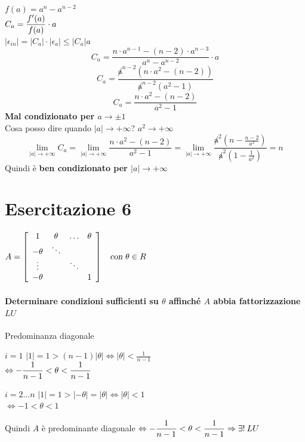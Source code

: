 \documentclass[10pt]{book}
\begin{document}
\paragraph{} $f(a) = a^n - a^{n-2}$\\
$C_a = \mathlarger{\frac{f'(a)}{f(a)}\cdot a}$\\
$|\epsilon_{in}| = |C_a|\cdot|\epsilon_a| \leq |C_a|a$
$$C_a = \frac{n\cdot a^{n-1} - (n-2)\cdot a^{n-3}}{a^n - a^{n-2}}\cdot a$$
$$C_a = \frac{\not a^{n-2}(n\cdot a^2 - (n-2))}{\not a^{n-2}(a^2 - 1)}$$
$$C_a = \frac{n\cdot a^2 - (n-2)}{a^2 - 1}$$
\textbf{Mal condizionato per $a\to\pm1$}\\
Cosa posso dire quando $|a| \to +\infty$? $a^2\to+\infty$\\
$$\lim_{|a|\to+\infty} C_a = \lim_{|a|\to+\infty} \frac{n\cdot a^2 - (n-2)}{a^2 - 1} = \lim_{|a|\to+\infty} \frac{\not a^2(n - \frac{n-2}{a^2})}{\not a^2(1 - \frac{1}{a^2})} = n$$
Quindi è \textbf{ben condizionato per $|a|\to+\infty$}
\section{Esercitazione 6}
\begin{math}
A = \left[ 
\begin{array}{c c c c}
1 & \theta & \ldots & \theta \\
-\theta & \ddots & &\\
\vdots & & \ddots &\\
-\theta & & & 1
\end{array}
\right]
\:\:\:\:\textsl{con }\theta\in R
\end{math}
\paragraph{Determinare condizioni sufficienti su $\theta$ affinché $A$ abbia fattorizzazione $LU$} Predominanza diagonale
\begin{list}{}{}
	\item[$i = 1$] $|1| = 1 > (n-1)|\theta| \Leftrightarrow |\theta| < \frac{1}{n-1}$\\
$\Leftrightarrow \mathlarger{-\frac{1}{n-1} < \theta < \frac{1}{n-1}}$
\item[$i = 2\ldots n$] $|1| = 1 > |-\theta| = |\theta| \Leftrightarrow |\theta| < 1$\\ 
$\Leftrightarrow -1 < \theta < 1 $
\end{list}
Quindi $A$ è predominante diagonale $\Leftrightarrow \mathlarger{-\frac{1}{n-1} < \theta < \frac{1}{n-1}} \Rightarrow \exists!\: LU$
\end{document}
